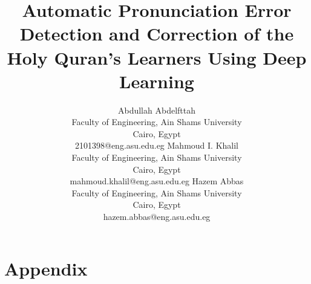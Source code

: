 \documentclass[11pt,a4paper]{article}
\begin{document}
\title{Automatic Pronunciation Error Detection and Correction of the Holy Quran's Learners Using Deep Learning}

\author{
  Abdullah Abdelfttah%
  \\
  Faculty of Engineering, Ain Shams University%
  \\
  Cairo, Egypt%
  \\
  2101398@eng.asu.edu.eg%
  \And
  Mahmoud I. Khalil%
  \\
  Faculty of Engineering, Ain Shams University%
  \\
  Cairo, Egypt%
  \\
  mahmoud.khalil@eng.asu.edu.eg%
  \And
  Hazem Abbas%
  \\
  Faculty of Engineering, Ain Shams University%
  \\
  Cairo, Egypt%
  \\
  hazem.abbas@eng.asu.edu.eg%
}

\date{}

\maketitle

\begin{abstract}

\end{abstract}









% 




\appendix
\section{Appendix}\label{Appendix}

% 
% 
% 
% 
\end{document}
